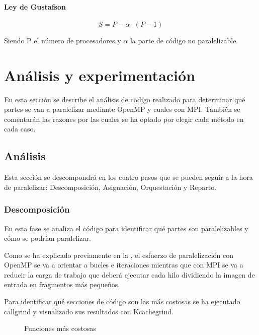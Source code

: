 \documentclass[12pt]{report} %
\begin{document}
\subsubsection{Ley de Gustafson}
\label{sec:Gustafson}

\[ S = P - \alpha \cdot (P - 1)\]

Siendo P el número de procesadores y $\alpha$ la parte de código no paralelizable.


\chapter{Análisis y experimentación}

En esta sección se describe el análisis de código realizado para determinar qué partes se van a
paralelizar mediante OpenMP y cuales con MPI. También se comentarán las razones por las cuales se ha optado
por elegir cada método en cada caso.

\section{Análisis}

Esta sección se descompondrá en los cuatro pasos que se pueden seguir a la hora de paralelizar:
Descomposición, Asignación, Orquestación y Reparto.

\subsection{Descomposición}

En esta fase se analiza el código para identificar qué partes son paralelizables y cómo se podrían paralelizar.

Como se ha explicado previamente en la , el esfuerzo de paralelización con OpenMP se va
a orientar a bucles e iteraciones mientras que con MPI se va a reducir la carga de trabajo que deberá ejecutar
cada hilo dividiendo la imagen de entrada en fragmentos más pequeños.

Para identificar qué secciones de código son las más costosas se ha ejecutado callgrind y visualizado sus
resultados con Kcachegrind.

\begin{figure}[H]
    \caption{Funciones más costosas}
    \label{fig:kcachegrind}
\end{figure}
\end{document}

